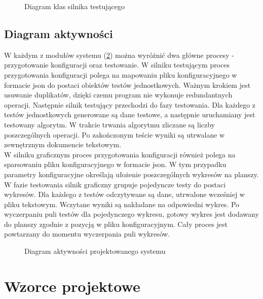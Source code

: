 \begin{figure}[]
	\centering
	
	\caption{Diagram klas silnika testującego}
	\label{fig:uml-class}
\end{figure}

\subsection{Diagram aktywności}
W każdym z modułów systemu (\ref{fig:uml-activity}) można wyróżnić dwa główne procesy - przygotowanie konfiguracji oraz testowanie. W silniku testującym proces przygotowania konfiguracji polega na mapowaniu pliku konfiguracyjnego w formacie json do postaci obiektów testów jednostkowych. Ważnym krokiem jest usuwanie duplikatów, dzięki czemu program nie wykonuje redundantnych operacji. Następnie silnik testujący przechodzi do fazy testowania. Dla każdego z testów jednostkowych generowane są dane testowe, a następnie uruchamiany jest testowany algorytm. W trakcie trwania algorytmu zliczane są liczby poszczególnych operacji. Po zakończonym teście wyniki są utrwalane w zewnętrznym dokumencie tekstowym.\\

W silniku graficznym proces przygotowania konfiguracji również polega na sparsowaniu pliku konfiguracyjnego w formacie json. W tym przypadku parametry konfiguracyjne określają ułożenie poszczególnych wykresów na planszy. W fazie testowania silnik graficzny grupuje pojedyncze testy do postaci wykresów. Dla każdego z testów odczytywane są dane, utrwalone wcześniej w pliku tekstowym. Wczytane wyniki są nakładane na odpowiedni wykres. Po wyczerpaniu puli testów dla pojedynczego wykresu, gotowy wykres jest dodawany do planszy zgodnie z pozycją w pliku konfiguracyjnym. Cały proces jest powtarzany do momentu wyczerpania puli wykresów.\\

\begin{figure}[]
	\centering
	\qquad
	\caption{Diagram aktywności projektowanego systemu}
	\label{fig:uml-activity}
\end{figure}

\section{Wzorce projektowe}

